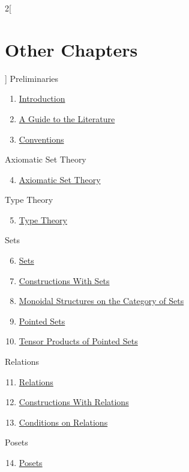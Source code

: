 \begin{multicols}{2}[\section{Other Chapters}]
\noindent
Preliminaries
\begin{enumerate}
\item \hyperref[introduction:section-phantom]{Introduction}
\item \hyperref[a-guide-to-the-literature:section-phantom]{A Guide to the Literature}
\item \hyperref[conventions:section-phantom]{Conventions}
\end{enumerate}
Axiomatic Set Theory
\begin{enumerate}
\setcounter{enumi}{3}
\item \hyperref[axiomatic-set-theory:section-phantom]{Axiomatic Set Theory}
\end{enumerate}
Type Theory
\begin{enumerate}
\setcounter{enumi}{4}
\item \hyperref[type-theory:section-phantom]{Type Theory}
\end{enumerate}
Sets
\begin{enumerate}
\setcounter{enumi}{5}
\item \hyperref[sets:section-phantom]{Sets}
\item \hyperref[constructions-with-sets:section-phantom]{Constructions With Sets}
\item \hyperref[monoidal-structures-on-the-category-of-sets:section-phantom]{Monoidal Structures on the Category of Sets}
\item \hyperref[pointed-sets:section-phantom]{Pointed Sets}
\item \hyperref[tensor-products-of-pointed-sets:section-phantom]{Tensor Products of Pointed Sets}
\end{enumerate}
Relations
\begin{enumerate}
\setcounter{enumi}{10}
\item \hyperref[relations:section-phantom]{Relations}
\item \hyperref[constructions-with-relations:section-phantom]{Constructions With Relations}
\item \hyperref[conditions-on-relations:section-phantom]{Conditions on Relations}
\end{enumerate}
Posets
\begin{enumerate}
\setcounter{enumi}{13}
\item \hyperref[posets:section-phantom]{Posets}

\end{enumerate}
\end{multicols}

